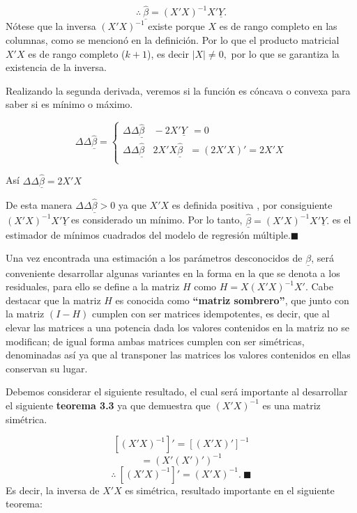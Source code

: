 \documentclass[
  a4paper,
  oneside,
  openany]{book}
\begin{document}
\[\therefore \  \underline{\hat{\beta}}=\left(X'X\right)^{-1}X'\underline{Y}.\]
Nótese que la inversa \(\left(X'X\right)^{-1}\) existe porque \(X\) es de rango completo en las columnas, como se mencionó en la definición. Por lo que el producto matricial \(X'X\) es de rango completo (\(k+1\)), es decir \(|X|\neq 0,\) por lo que se garantiza la existencia de la inversa.

Realizando la segunda derivada, veremos si la función es cóncava o convexa para saber si es mínimo o máximo.

\[
\Delta \Delta \underline{\hat{\beta}}=\left\{
\begin{array}{ll}
\Delta \Delta \underline{\hat{\beta}} \ \ \ \ -2X' \underline{Y} \ \ =0 \\
\Delta \Delta \underline{\hat{\beta}} \ \ \ \ 2X'X \underline{\hat{\beta}}  \ \ \ = \left(2X'X\right)' =2X'X \\
\end{array}
\right.
\]

Así \(\Delta \Delta \underline{\hat{\beta}}=2X'X\)

De esta manera \(\Delta \Delta \underline{\hat{\beta}}>0\) ya que \(X'X\) es definida positiva , por consiguiente \((X'X)^{-1}X'\underline{Y}\) es considerado un mínimo. Por lo tanto, \(\underline{\hat{\beta}}=\left(X'X\right)^{-1}X'\underline{Y}.\) es el estimador de mínimos cuadrados del modelo de regresión múltiple.\(\blacksquare\)

Una vez encontrada una estimación a los parámetros desconocidos de \(\underline{\beta}\), será conveniente desarrollar algunas variantes en la forma en la que se denota a los residuales, para ello se define a la matriz \(H\) como \(H=X(X'X)^{-1}X'.\) Cabe destacar que la matriz \(H\) es conocida como \textbf{``matriz sombrero''}, que junto con la matriz \((I-H)\) cumplen con ser matrices idempotentes, es decir, que al elevar las matrices a una potencia dada los valores contenidos en la matriz no se modifican; de igual forma ambas matrices cumplen con ser simétricas, denominadas así ya que al transponer las matrices los valores contenidos en ellas conservan su lugar.

Debemos considerar el siguiente resultado, el cual será importante al desarrollar el siguiente \textbf{teorema 3.3} ya que demuestra que \((X'X)^{-1}\) es una matriz simétrica.

\[[(X'X)^{-1}]'=[(X'X)']^{-1}\]
\[=(X'(X')')^{-1}\]
\[\therefore \  [(X'X)^{-1}]'= (X'X)^{-1}. \ \blacksquare\]
Es decir, la inversa de \(X'X\) es simétrica, resultado importante en el siguiente teorema:
\end{document}
